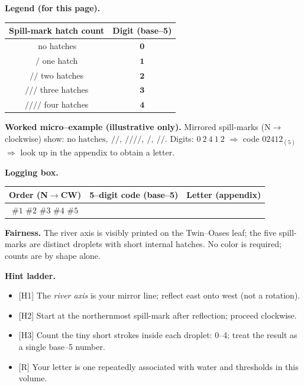 \documentclass[11pt]{article}
\numberwithin{equation}{section} %
\theoremstyle{plain} %
\theoremstyle{definition} %
\theoremstyle{remark} %
\begin{document}
\medskip
\noindent\textbf{Legend (for this page).}
\begin{center}
\begin{tabular}{c|c}
\textbf{Spill-mark hatch count} & \textbf{Digit (base--5)} \\
\hline
\(\,\)no hatches & \(\mathbf{0}\) \\
\(/\) one hatch & \(\mathbf{1}\) \\
\(/\!\!/\) two hatches & \(\mathbf{2}\) \\
\(/\!\!/\!\!/\) three hatches & \(\mathbf{3}\) \\
\(/\!\!/\!\!/\!\!/\) four hatches & \(\mathbf{4}\) \\
\end{tabular}
\end{center}

\medskip
\noindent\textbf{Worked micro--example (illustrative only).}  
Mirrored spill-marks (N$\rightarrow$clockwise) show: \(\text{no hatches},\ /\!\!/,\ /\!\!/\!\!/\!\!/,\ /,\ /\!\!/\).  
Digits: \(0\ 2\ 4\ 1\ 2\) \(\Rightarrow\) code \(02412_{(5)}\) \(\Rightarrow\) look up in the appendix to obtain a letter.

\medskip
\noindent\textbf{Logging box.}
\begin{center}
\begin{tabular}{c|c|c}
\textbf{Order (N$\rightarrow$CW)} & \textbf{5--digit code (base--5)} & \textbf{Letter (appendix)} \\
\hline
\(\#1\) \(\#2\) \(\#3\) \(\#4\) \(\#5\) & \hspace{3.5cm} & \hspace{1.2cm} \\
\end{tabular}
\end{center}

\medskip
\noindent\textbf{Fairness.} The river axis is visibly printed on the Twin--Oases leaf; the five spill-marks are distinct droplets with short internal hatches. No color is required; counts are by shape alone.

\medskip
\noindent\textbf{Hint ladder.}
\begin{itemize}\setlength\itemsep{0.25em}
  \item \textsc{[H1]} The \emph{river axis} is your mirror line; reflect east onto west (not a rotation).
  \item \textsc{[H2]} Start at the northernmost spill-mark after reflection; proceed clockwise.
  \item \textsc{[H3]} Count the tiny short strokes inside each droplet: 0--4; treat the result as a single base--5 number.
  \item \textsc{[R]} Your letter is one repeatedly associated with water and thresholds in this volume.
\end{itemize}
\end{document}
